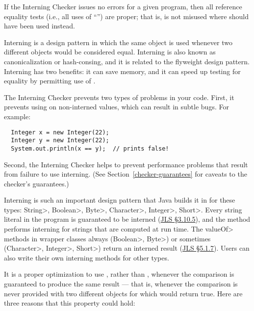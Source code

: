 \htmlhr
{}

If the Interning Checker issues no errors for a given program, then all
reference equality tests (i.e., all uses of ``\code{==}'') are proper;
that is,
\code{==} is not misused where  should have been used instead.

Interning is a design pattern in which the same object is used whenever two
different objects would be considered equal.  Interning is also known as
canonicalization or hash-consing, and it is related to the flyweight design
pattern.
Interning has two benefits:  it can save memory, and it can speed up testing for
equality by permitting use of \code{==}.

The Interning Checker prevents two types of problems in your code.
First, it prevents using \code{==} on
non-interned values, which can result in subtle bugs.  For example:

\begin{Verbatim}
  Integer x = new Integer(22);
  Integer y = new Integer(22);
  System.out.println(x == y);  // prints false!
\end{Verbatim}

\noindent
Second,
the Interning Checker helps to prevent performance problems that result
from failure to use interning.
(See Section~\ref{checker-guarantees} for caveats to the checker's guarantees.)

Interning is such an important design pattern that Java builds it in for
these types: \<String>, \<Boolean>, \<Byte>, \<Character>, \<Integer>,
\<Short>.  Every string literal in the program is guaranteed to be interned
(\href{https://docs.oracle.com/javase/specs/jls/se17/html/jls-3.html#jls-3.10.5}{JLS
  \S3.10.5}), and the
 method
performs interning for strings that are computed at run time.
The \<valueOf> methods in wrapper classes always (\<Boolean>, \<Byte>) or
sometimes (\<Character>, \<Integer>, \<Short>) return an interned result
(\href{https://docs.oracle.com/javase/specs/jls/se17/html/jls-5.html#jls-5.1.7}{JLS \S5.1.7}).
Users can also write their own interning methods for other types.

It is a proper optimization to use \code{==}, rather than ,
whenever the comparison is guaranteed to produce the same result --- that
is, whenever the comparison is never provided with two different objects
for which  would return true.  Here are three reasons that
this property could hold:

